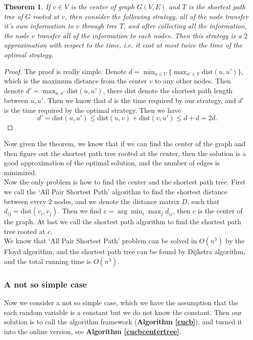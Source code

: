 \documentclass{article}
\theoremstyle{plain}
\newtheorem{thm}{Theorem}[section]
\theoremstyle{definition}
\theoremstyle{remark}
\begin{document}
    \begin{thm}
        If $v\in V$ is the center of graph $G(V,E)$ and $T$ is the shortest path tree of $G$ rooted at $v$, then consider the following strategy, all of the node transfer it's own information to $v$ through tree $T$, and after collecting all the information, the node $v$ transfer all of the information to each nodes. Then this strategy is a $2$ approximation with respect to the time, i.e. it cost at most twice the time of the optimal strategy.
    \end{thm}

    \begin{proof}
        The proof is really simple. Denote $d = \min_{u\in V}\{\max_{u'\in V}\text{dist}(u,u')\}$, which is the maximum distance from the center $v$ to any other nodes. Then denote $d' = \max_{u,u'}\text{dist}(u,u')$, there $\text{dist}$ denote the shortest path length between $u,u'$. Then we know that $d$ is the time required by our strategy, and $d'$ is the time required by the optimal strategy. Then we have
        \[d' = \text{dist}(u,u') \le \text{dist}(u,v) + \text{dist}(v,u') \le d + d = 2d.\]
    \end{proof}

    Now given the theorem, we know that if we can find the center of the graph and then figure out the shortest path tree rooted at the center, then the solution is a good approximation of the optimal solution, and the number of edges is minimized.\\

    Now the only problem is how to find the center and the shortest path tree. First we call the `All Pair Shortest Path' algorithm to find the shortest distance between every $2$ nodes, and we denote the distance matrix $D$, such that $d_{ij} = \text{dist}(v_i,v_j)$. Then we find $c = \arg\min_{i}\max_j d_{ij}$, then $c$ is the center of the graph. At last we call the shortest path algorithm to find the shortest path tree rooted at $c$.\\

    We know that `All Pair Shortest Path' problem can be solved in $O(n^3)$ by the Floyd algorithm, and the shortest path tree can be found by Dijkstra algorithm, and the total running time is $O(n^3)$.

    \subsubsection{A not so simple case}
    Now we consider a not so simple case, which we have the assumption that the each random variable is a constant but we do not know the constant. Then our solution is to call the algorithm framework (\textbf{Algorithm \ref{cucb}}), and turned it into the online version, see \textbf{Algorithm \ref{cucbcentertree}}.
\end{document}
